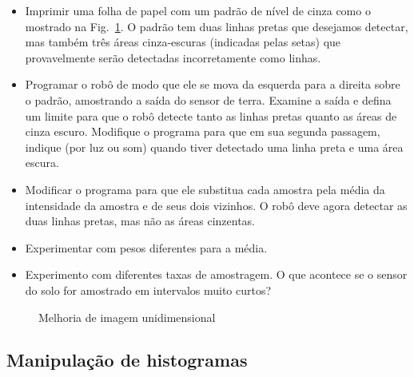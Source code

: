 \begin{framed}
\begin{itemize}
\item Imprimir uma folha de papel com um padrão de nível de cinza como o mostrado na Fig.~\ref{fig.one-enhance}. O padrão tem duas linhas pretas que desejamos detectar, mas também três áreas cinza-escuras (indicadas pelas setas) que provavelmente serão detectadas incorretamente como linhas.
\item Programar o robô de modo que ele se mova da esquerda para a direita sobre o padrão, amostrando a saída do sensor de terra. Examine a saída e defina um limite para que o robô detecte tanto as linhas pretas quanto as áreas de cinza escuro. Modifique o programa para que em sua segunda passagem, indique (por luz ou som) quando tiver detectado uma linha preta e uma área escura.
\item Modificar o programa para que ele substitua cada amostra pela média da intensidade da amostra e de seus dois vizinhos. O robô deve agora detectar as duas linhas pretas, mas não as áreas cinzentas.
\item Experimentar com pesos diferentes para a média.
\item Experimento com diferentes taxas de amostragem. O que acontece se o sensor do solo for amostrado em intervalos muito curtos?
\end{itemize}
\end{framed}

\begin{figure}
\begin{center}
\caption{Melhoria de imagem unidimensional}\label{fig.one-enhance}
\end{center}
\end{figure}

\subsection{Manipulação de histogramas}

